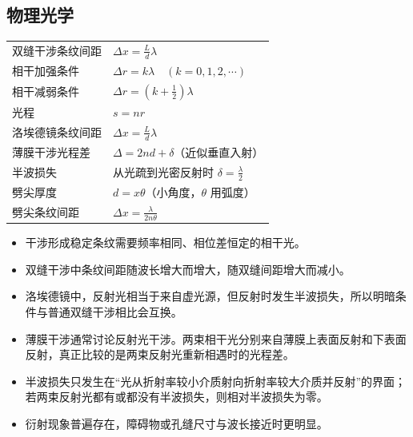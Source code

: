 
\subsection{物理光学}
\begin{tabularx}{\columnwidth}{XX}
  双缝干涉条纹间距 & $\Delta x=\frac{L}{d}\lambda$\\
  相干加强条件 & $\Delta r=k\lambda\quad(k=0,1,2,\cdots)$\\
  相干减弱条件 & $\Delta r=(k+\frac12)\lambda$\\
  光程 & $s=nr$\\
  洛埃德镜条纹间距 & $\Delta x=\frac{L}{d}\lambda$\\
  薄膜干涉光程差 & $\Delta=2nd+\delta$（近似垂直入射）\\
  半波损失 & 从光疏到光密反射时 $\delta=\frac{\lambda}{2}$\\
  劈尖厚度 & $d=x\theta$（小角度，$\theta$ 用弧度）\\
  劈尖条纹间距 & $\Delta x=\frac{\lambda}{2n\theta}$\\
\end{tabularx}

\begin{formulanotebox}
\begin{itemize}[leftmargin=1.5em]
  \item 干涉形成稳定条纹需要频率相同、相位差恒定的相干光。
  \item 双缝干涉中条纹间距随波长增大而增大，随双缝间距增大而减小。
  \item 洛埃德镜中，反射光相当于来自虚光源，但反射时发生半波损失，所以明暗条件与普通双缝干涉相比会互换。
  \item 薄膜干涉通常讨论反射光干涉。两束相干光分别来自薄膜上表面反射和下表面反射，真正比较的是两束反射光重新相遇时的光程差。
  \item 半波损失只发生在“光从折射率较小介质射向折射率较大介质并反射”的界面；若两束反射光都有或都没有半波损失，则相对半波损失为零。
  \item 衍射现象普遍存在，障碍物或孔缝尺寸与波长接近时更明显。
\end{itemize}
\end{formulanotebox}

